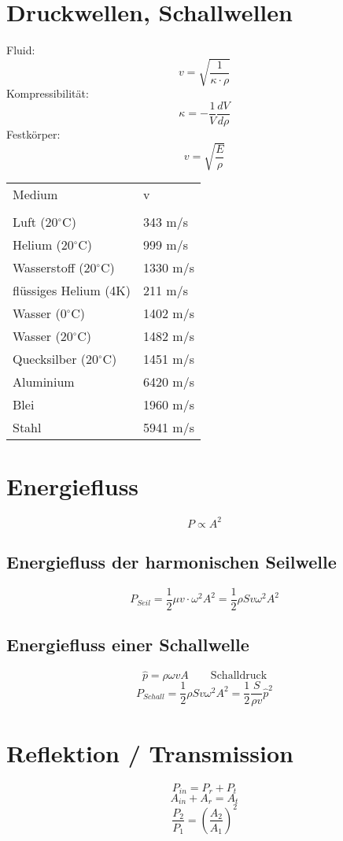 \section{Druckwellen, Schallwellen}
Fluid: 
\[ \boxed{v = \sqrt{\frac{1}{\kappa \cdot \rho}}} \]
Kompressibilität: 
\[ \boxed{\kappa = -\frac{1}{V} \frac{d V}{d \rho}} \]
Festkörper: 
\[ \boxed{v = \sqrt{\frac{E}{\rho}}} \]
\begin{tabular}{ll}
\rowcolor{white} Medium & v \\\\
\rowcolor{lgray} Luft (20$^\circ$C) & 343 m/s \\
\rowcolor{white} Helium (20$^\circ$C) & 999 m/s \\
\rowcolor{lgray} Wasserstoff (20$^\circ$C) & 1330 m/s \\
\rowcolor{white} flüssiges Helium (4K) & 211 m/s \\
\rowcolor{lgray} Wasser (0$^\circ$C) & 1402 m/s \\
\rowcolor{white} Wasser (20$^\circ$C) & 1482 m/s \\
\rowcolor{lgray} Quecksilber (20$^\circ$C) & 1451 m/s \\
\rowcolor{white} Aluminium & 6420 m/s \\
\rowcolor{lgray} Blei & 1960 m/s \\
\rowcolor{white} Stahl & 5941 m/s \\
\end{tabular}

\section{Energiefluss}
\[ \boxed{P \propto A^2} \]
\subsection{Energiefluss der harmonischen Seilwelle}
\[ \boxed{P_{Seil} = \frac{1}{2} \mu v \cdot \omega^2 A^2 
= \frac{1}{2} \rho S v \omega^2 A^2} \]
\subsection{Energiefluss einer Schallwelle}
\[ \boxed{\hat{p} = \rho \omega v A} \qquad \text{Schalldruck} \]
\[ \boxed{P_{Schall} = \frac{1}{2} \rho S v \omega^2 A^2 
= \frac{1}{2} \frac{S}{\rho v} \hat{p}^2} \]

\section{Reflektion / Transmission}
\[ \boxed{P_{in} = P_r + P_t} \]
\[ \boxed{A_{in} + A_r = A_t} \]
\[ \boxed{\frac{P_2}{P_1} = \left(\frac{A_2}{A_1}\right)^2} \]

